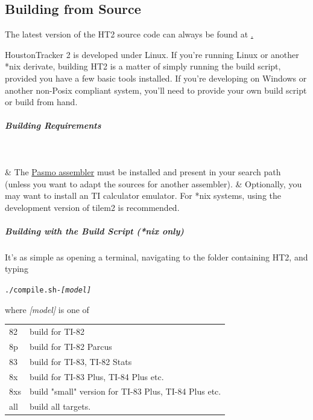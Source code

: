 \documentclass[12pt]{report}	%
\begin{document}
\begin{appendices}
\chapter{Building from Source}

The latest version of the HT2 source code can always be found at \href{github.com/utz82/HoustonTracker2}.

HoustonTracker 2 is developed under Linux. If you're running Linux or another *nix derivate, building HT2 is a matter of simply running the build script, provided you have a few basic tools installed. If you're developing on Windows or another non-Posix compliant system, you'll need to provide your own build script or build from hand.

\paragraph{Building Requirements} ~\\
\begin{easylist}[itemize]
& The \href{http://pasmo.speccy.org/}{Pasmo assembler} must be installed and present in your search path (unless you want to adapt the sources for another assembler).
& Optionally, you may want to install an TI calculator emulator. For *nix systems, using the development version of tilem2 is recommended.
\end{easylist}

\paragraph{Building with the Build Script (*nix only)} It's as simple as opening a terminal, navigating to the folder containing HT2, and typing

\begin{alltt}
./compile.sh \emph{-[model]}
\end{alltt}

where \emph{[model]} is one of

\begin{tabularx}{\textwidth}{p{} X}
82 & build for TI-82 \\
8p & build for TI-82 Parcus \\
83 & build for TI-83, TI-82 Stats \\
8x & build for TI-83 Plus, TI-84 Plus etc. \\
8xs & build "small" version for TI-83 Plus, TI-84 Plus etc. \\
all & build all targets. \\
\end{tabularx} ~\\


\end{appendices}
\end{document}
